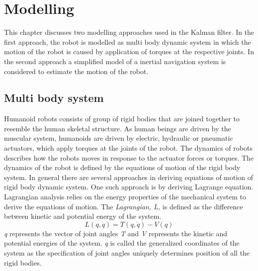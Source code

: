 
%
\chapter{Modelling}
This chapter discusses two modelling approaches used in the Kalman filter.
In the first approach, the robot is modelled as multi body dynamic system in which the motion of the robot is caused by application of torques at the respective joints.
In the second approach a simplified model of a inertial navigation system is considered to estimate the motion of the robot.
\section{Multi body system}
Humanoid robots consists of group of rigid bodies that are joined together to resemble the human skeletal structure. As human beings are driven by the muscular system, humanoids are driven by electric, hydraulic or pneumatic actuators, which apply torques at the joints of the robot. The dynamics of robots describes how the robots moves in response to the actuator forces or torques. The dynamics of the robot is defined by the  equations of motion of the rigid body system. In general there are several approaches in deriving equations of motion of rigid body dynamic system. One such approach is by deriving Lagrange equation. Lagrangian analysis relies on the energy properties of the mechanical system to derive the equations of motion. The \emph{Lagrangian, L,} is defined as the difference between kinetic and potential energy of the system. $$ L(q,\dot{q}) = T(q,\dot{q}) - V(q)$$ \emph{q} represents the vector of joint angles \emph{T} and \emph{V} represents the kinetic and potential energies of the system. \emph{q} is called the generalized coordinates of the system as the specification of joint angles uniquely determines position of all the rigid bodies.

